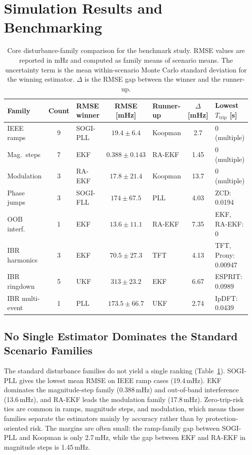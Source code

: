 ﻿\section{Simulation Results and Benchmarking}
\label{sec:results}

\begin{table}[t]
  \centering
  \caption{Core disturbance-family comparison for the benchmark study.
    RMSE values are reported in mHz and computed as family means of
    scenario means. The uncertainty term is the mean within-scenario Monte
    Carlo standard deviation for the winning estimator. $\Delta$ is the RMSE gap
    between the winner and the runner-up.}
  \label{tab:family_summary}
  \scriptsize
  \setlength{\tabcolsep}{2.8pt}
  \renewcommand{\arraystretch}{1.1}
  \begin{tabular}{l c l c l c l}
    \toprule
    Family & Count & RMSE winner & RMSE [mHz] & Runner-up & $\Delta$ [mHz] & Lowest $T_{\mathrm{trip}}$ [s] \\
    \midrule
    IEEE ramps & 9 & SOGI-PLL & $19.4 \pm 6.4$ & Koopman & 2.7 & 0 (multiple) \\
    Mag.\ steps & 7 & EKF & $0.388 \pm 0.143$ & RA-EKF & 1.45 & 0 (multiple) \\
    Modulation & 3 & RA-EKF & $17.8 \pm 21.4$ & Koopman & 13.7 & 0 (multiple) \\
    Phase jumps & 3 & SOGI-FLL & $174 \pm 67.5$ & PLL & 4.03 & ZCD: 0.0194 \\
    OOB interf. & 1 & EKF & $13.6 \pm 11.1$ & RA-EKF & 7.35 & EKF, RA-EKF: 0 \\
    IBR harmonics & 3 & EKF & $70.5 \pm 27.3$ & TFT & 4.13 & TFT, Prony: 0.00947 \\
    IBR ringdown & 5 & UKF & $313 \pm 23.2$ & EKF & 6.67 & ESPRIT: 0.0989 \\
    IBR multi-event & 1 & PLL & $173.5 \pm 66.7$ & UKF & 2.74 & IpDFT: 0.0439 \\
    \bottomrule
  \end{tabular}
\end{table}

\subsection{No Single Estimator Dominates the Standard Scenario Families}

The standard disturbance families do not yield a single ranking
(Table~\ref{tab:family_summary}). SOGI-PLL gives the lowest mean RMSE on IEEE
ramp cases (19.4\,mHz). EKF dominates the magnitude-step family
(0.388\,mHz) and out-of-band interference (13.6\,mHz), and RA-EKF leads the
modulation family (17.8\,mHz). Zero-trip-risk ties are common in ramps,
magnitude steps, and
modulation, which means those families separate the estimators mainly by
accuracy rather than by protection-oriented risk. The margins are often small:
the ramp-family gap between SOGI-PLL and Koopman is only 2.7\,mHz, while the
gap between EKF and RA-EKF in magnitude steps is 1.45\,mHz.


